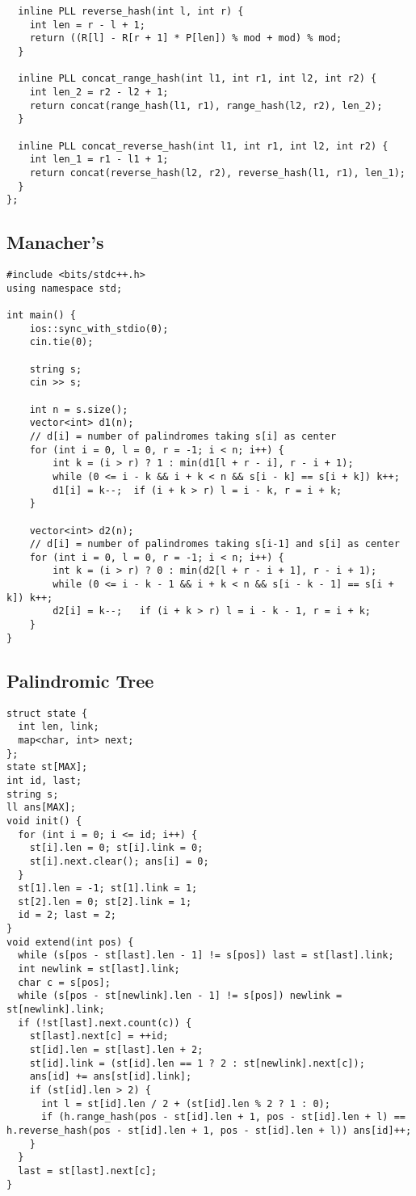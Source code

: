 \documentclass[FSZ,a4paper,onesided]{article}
\begin{document}
\begin{multicols*}{\COLS}
\begin{lstlisting}
  inline PLL reverse_hash(int l, int r) {
    int len = r - l + 1;
    return ((R[l] - R[r + 1] * P[len]) % mod + mod) % mod;
  }

  inline PLL concat_range_hash(int l1, int r1, int l2, int r2) {
    int len_2 = r2 - l2 + 1;
    return concat(range_hash(l1, r1), range_hash(l2, r2), len_2);
  }

  inline PLL concat_reverse_hash(int l1, int r1, int l2, int r2) {
    int len_1 = r1 - l1 + 1;
    return concat(reverse_hash(l2, r2), reverse_hash(l1, r1), len_1);
  }
};\end{lstlisting}
\subsection{Manacher's}
\begin{lstlisting}
#include <bits/stdc++.h>
using namespace std;

int main() {
    ios::sync_with_stdio(0);
    cin.tie(0);

    string s;
    cin >> s;

    int n = s.size();
    vector<int> d1(n);
    // d[i] = number of palindromes taking s[i] as center
    for (int i = 0, l = 0, r = -1; i < n; i++) {
        int k = (i > r) ? 1 : min(d1[l + r - i], r - i + 1);
        while (0 <= i - k && i + k < n && s[i - k] == s[i + k]) k++;
        d1[i] = k--;  if (i + k > r) l = i - k, r = i + k;
    }

    vector<int> d2(n);
    // d[i] = number of palindromes taking s[i-1] and s[i] as center
    for (int i = 0, l = 0, r = -1; i < n; i++) {
        int k = (i > r) ? 0 : min(d2[l + r - i + 1], r - i + 1);
        while (0 <= i - k - 1 && i + k < n && s[i - k - 1] == s[i + k]) k++;
        d2[i] = k--;   if (i + k > r) l = i - k - 1, r = i + k;
    }
}
\end{lstlisting}
\subsection{Palindromic Tree}
\begin{lstlisting}
struct state {
  int len, link;
  map<char, int> next;
};
state st[MAX];
int id, last;
string s;
ll ans[MAX];
void init() {
  for (int i = 0; i <= id; i++) {
    st[i].len = 0; st[i].link = 0;
    st[i].next.clear(); ans[i] = 0;
  }
  st[1].len = -1; st[1].link = 1;
  st[2].len = 0; st[2].link = 1;
  id = 2; last = 2;
}
void extend(int pos) {
  while (s[pos - st[last].len - 1] != s[pos]) last = st[last].link;
  int newlink = st[last].link;
  char c = s[pos];
  while (s[pos - st[newlink].len - 1] != s[pos]) newlink = st[newlink].link;
  if (!st[last].next.count(c)) {
    st[last].next[c] = ++id;
    st[id].len = st[last].len + 2;
    st[id].link = (st[id].len == 1 ? 2 : st[newlink].next[c]);
    ans[id] += ans[st[id].link];
    if (st[id].len > 2) {
      int l = st[id].len / 2 + (st[id].len % 2 ? 1 : 0);
      if (h.range_hash(pos - st[id].len + 1, pos - st[id].len + l) == h.reverse_hash(pos - st[id].len + 1, pos - st[id].len + l)) ans[id]++;
    }
  }
  last = st[last].next[c];
}
\end{lstlisting}

\end{multicols*}
\end{document}
